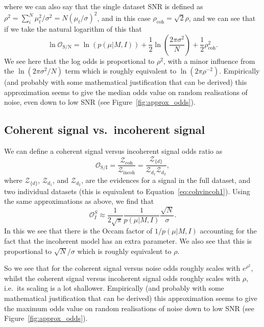 where we can also say that the single dataset SNR is defined as $\rho^2 = \sum_i^N \mu_t^2/\sigma^2 = N\left(\mu_t/\sigma\right)^2$, and in this case
$\rho_{\text{coh}} = \sqrt{2}\rho$, and we can see that if we take the natural logarithm of this that
\begin{equation}
\ln{\mathcal{O}_{\text{S}/\text{N}}} = \ln{\left(p(\mu|M,I)\right)} + \frac{1}{2}\ln{\left(\frac{2\pi\sigma^2}{N}\right)} + \frac{1}{2}\rho_{\text{coh}}^2.
\end{equation}
We see here that the log odds is proportional to $\rho^2$, with a minor influence from the $\ln{\left(2\pi\sigma^2/N\right)}$ term which is roughly equivalent
to $\ln{\left(2\pi\rho^{-2}\right)}$. Empirically (and probably with some mathematical justification that can be derived) this approximation seems to give the
median odds value on random realisations of noise, even down to low SNR (see Figure~\ref{fig:approx_odds}).

\subsection{Coherent signal vs.\ incoherent signal}

We can define a coherent signal versus incoherent signal odds ratio as
\begin{equation}
\mathcal{O}_{\text{S}/\text{I}} = \frac{\mathcal{Z}_{\text{coh}}}{\mathcal{Z}_{\text{incoh}}} = \frac{\mathcal{Z}_{\{d\}}}{\mathcal{Z}_{d_1}\mathcal{Z}_{d_2}},
\end{equation}
where $\mathcal{Z}_{\{d\}}$, $\mathcal{Z}_{d_1}$, and $\mathcal{Z}_{d_2}$, are the evidences for a signal in the full dataset, and two individual
datasets (this is equivalent to Equation~\ref{eq:cohvincoh1}). Using the same approximations as above, we find that
\begin{equation}
\mathcal{O}^{S}_I \approx \frac{1}{2\sqrt{\pi}}\frac{1}{p(\mu|M,I)}\frac{\sqrt{N}}{\sigma}.
\end{equation}
In this we see that there is the Occam factor of $1/p(\mu|M,I)$ accounting for the fact that the incoherent model has an extra parameter. We also see that this is
proportional to $\sqrt{N}/\sigma$ which is roughly equivalent to $\rho$.

So we see that for the coherent signal versus noise odds roughly scales with $e^{\rho^2}$, whilst the coherent signal versus incoherent signal odds roughly scales with
$\rho$, i.e.\ its scaling is a lot shallower. Empirically (and probably with some mathematical justification that can be derived) this approximation seems to give the
maximum odds value on random realisations of noise down to low SNR (see Figure~\ref{fig:approx_odds}).

